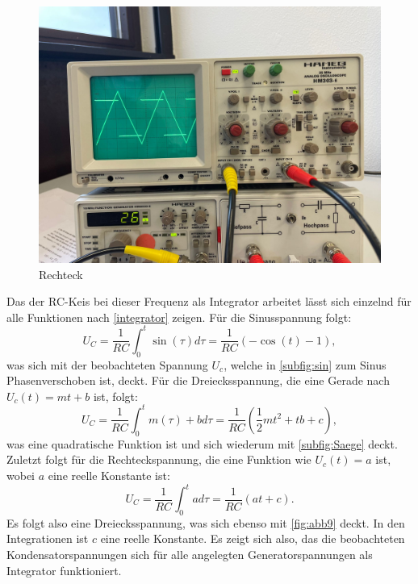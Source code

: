 \begin{figure}[H]
  \centering
  \includegraphics[scale=0.1]{content/rechteckInt.png}
  \caption{Rechteck}
  \label{fig:abb10}
\end{figure}
Das der RC-Keis bei dieser Frequenz als Integrator arbeitet lässt sich einzelnd für alle Funktionen nach \eqref{integrator} zeigen.
Für die Sinusspannung folgt:
\begin{equation*}
  U_C = \frac{1}{RC} \int_{0}^{t} \sin(\tau) d\tau = \frac{1}{RC}\left(-\cos(t) - 1\right),
\end{equation*}
was sich mit der beobachteten Spannung $U_c$, welche in \autoref{subfig:sin} zum Sinus Phasenverschoben ist, deckt.
Für die Dreiecksspannung, die eine Gerade nach $U_c(t) = mt + b$ ist, folgt:
\begin{equation*}
  U_C = \frac{1}{RC} \int_{0}^{t} m(\tau) + b d\tau = \frac{1}{RC}\left(\frac{1}{2}mt^2 + tb + c\right),
\end{equation*}
was eine quadratische Funktion ist und sich wiederum mit \autoref{subfig:Saege} deckt.
Zuletzt folgt für die Rechteckspannung, die eine Funktion wie $U_c(t) = a$ ist, wobei $a$ eine reelle Konstante ist:
\begin{equation*}
  U_C = \frac{1}{RC} \int_{0}^{t} a d\tau = \frac{1}{RC}\left(at + c\right).
\end{equation*}
Es folgt also eine Dreiecksspannung, was sich ebenso mit \autoref{fig:abb9} deckt.
In den Integrationen ist $c$ eine reelle Konstante.
Es zeigt sich also, das die beobachteten Kondensatorspannungen sich für alle angelegten Generatorspannungen als Integrator funktioniert.

